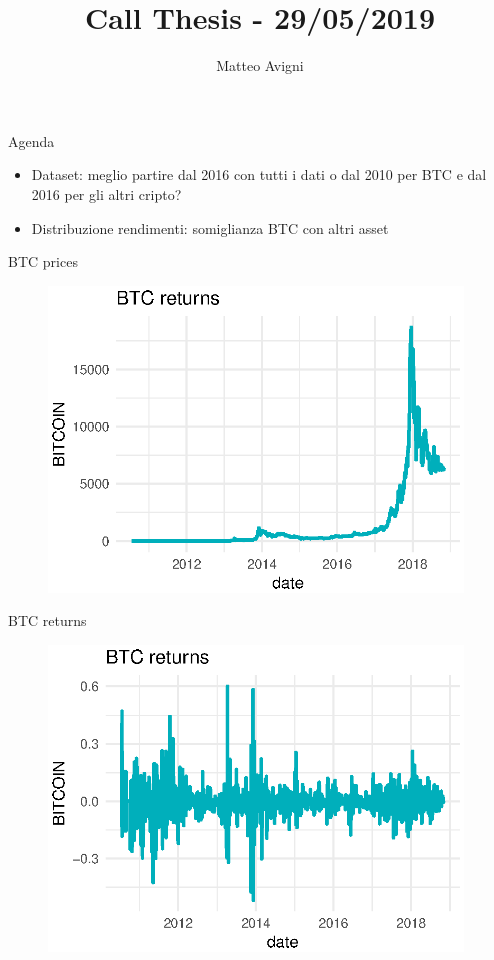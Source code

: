 \documentclass{beamer}
\title{Call Thesis - 29/05/2019}
\author{Matteo Avigni}
\begin{document}
\begin{frame}[plain]
    \maketitle
\end{frame}


\begin{frame}{Agenda}
	\begin{itemize}		
		\item Dataset: meglio partire dal 2016 con tutti i dati o dal 2010 per BTC e dal 2016 per gli altri cripto?
		\item Distribuzione rendimenti: somiglianza BTC con altri asset
	\end{itemize}
\end{frame}
\begin{frame}{BTC prices}
	\begin{figure}[linewidth=250mm]	
		\includegraphics[width=110mm]{BTCprices.eps}
	\end{figure}
\end{frame}
\begin{frame}{BTC returns}
	\begin{figure}[linewidth=250mm]	
		\includegraphics[width=110mm]{BTCreturns.eps}
	\end{figure}
\end{frame}
\end{document}
